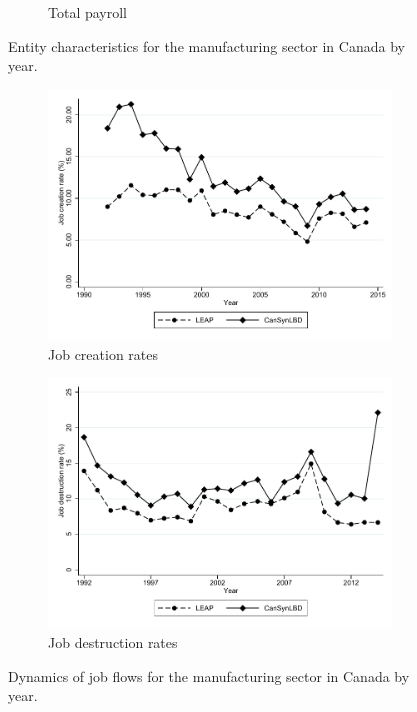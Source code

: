 \begin{figure}[H]
\begin{subfigure}[h]{0.48\linewidth}
\caption{Total payroll}
\end{subfigure}%
\caption{Entity characteristics for the manufacturing sector in Canada by year.}\label{fig:entity_chracteristics_manufac}
\end{figure}


\begin{figure}[H]
\begin{subfigure}[h]{0.48\linewidth}
\includegraphics[width=\linewidth]{graphs/Job_creation_rate_by_year_Manufacturing_bw.pdf}
\caption{Job creation rates}
\end{subfigure}
\hfill
\begin{subfigure}[h]{0.48\linewidth}
\includegraphics[width=\linewidth]{graphs/Job_destruction_rate_by_year_Manufacturing_bw.pdf}
\caption{Job destruction rates}
\end{subfigure}%
\caption{Dynamics of job flows for the manufacturing sector in Canada by year.}\label{fig:job_flows_manufac}
\end{figure}



